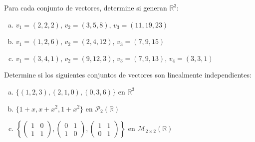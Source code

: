 \begin{prob} Para cada conjunto de vectores, determine si generan $\mathbb{R}^3$:
\begin{enumerate}[(a)]
\item $v_1 = (2,2,2)$, $v_2 = (3,5,8)$, $v_3 = (11,19,23)$
\item $v_1 = (1,2,6)$, $v_2 = (2,4,12)$, $v_3 = (7,9,15)$
\item $v_1 = (3,4,1)$, $v_2 = (9,12,3)$, $v_3 = (7,9,13)$, $v_4 = (3,3,1)$
\end{enumerate}
\end{prob}

\begin{prob} Determine si los siguientes conjuntos de vectores son linealmente independientes:
\begin{enumerate}[(a)]
\item $\{(1,2,3), (2,1,0), (0,3,6)\}$ en $\mathbb{R}^3$
\item $\{1 + x, x + x^2, 1 + x^2\}$ en $\mathcal{P}_2(\mathbb{R})$
\item $\left\{\begin{pmatrix} 1 & 0 \\ 1 & 1 \end{pmatrix}, \begin{pmatrix} 0 & 1 \\ 1 & 0 \end{pmatrix}, \begin{pmatrix} 1 & 1 \\ 0 & 1 \end{pmatrix}\right\}$ en $\mathcal{M}_{2 \times 2}(\mathbb{R})$
\end{enumerate}
\end{prob}

